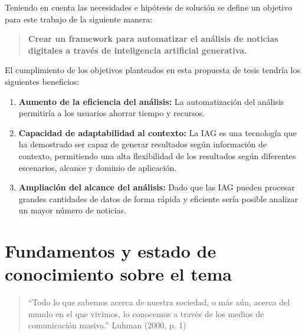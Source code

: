 \documentclass[12pt]{article}
\begin{document}

Teniendo en cuenta las necesidades e hipótesis de solución se define un objetivo para este trabajo de la siguiente manera: 

\begin{quote}
        \textbf{Crear un framework para automatizar el análisis de noticias digitales a través de inteligencia artificial generativa.
        }
\end{quote}

El cumplimiento de los objetivos planteados en esta propuesta de tesis tendría los siguientes beneficios:


\begin{enumerate}
    \item \textbf{Aumento de la eficiencia del análisis:} La automatización del análisis permitiría a los usuarios ahorrar tiempo y recursos. 

    \item \textbf{Capacidad de adaptabilidad al contexto:} La IAG es una tecnología que ha demostrado ser capaz de generar resultados según información de contexto, permitiendo una alta flexibilidad de los resultados según diferentes escenarios, alcance y dominio de aplicación. 

    \item \textbf{Ampliación del alcance del análisis:} Dado que las IAG pueden procesar grandes cantidades de datos de forma rápida y eficiente sería posible analizar un mayor número de noticias.

\end{enumerate}


\section{Fundamentos y estado de conocimiento sobre el tema}

 \begin{quote}
     ``Todo lo que sabemos acerca de nuestra sociedad, o más aún, acerca del mundo en el que vivimos, lo conocemos a través de los medios de comunicación masiva.''  Luhman (2000, p. 1) \cite{luhmann2000}
 \end{quote}
\end{document}
